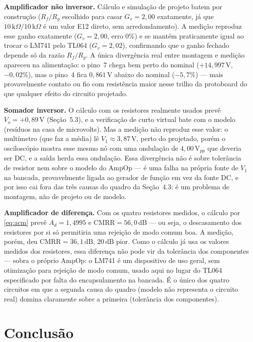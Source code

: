 \documentclass[11pt,a4paper]{article}
\begin{document}
\textbf{Amplificador não inversor.} Cálculo e simulação de projeto batem por construção
($R_f/R_g$ escolhido para casar $G_v{=}2{,}00$ exatamente, já que $10\,\text{k}\Omega/10\,
\text{k}\Omega$ é um valor E12 direto, sem arredondamento). A medição reproduz esse ganho
exatamente ($G_v{=}2{,}00$, erro $0\%$) e se mantém praticamente igual ao trocar o LM741 pelo
TL064 ($G_v{=}2{,}02$), confirmando que o ganho fechado depende só da razão $R_f/R_g$. A única
divergência real entre montagem e medição apareceu na alimentação: o pino~7 chega bem perto do
nominal ($+14{,}997\,\text{V}$, $-0{,}02\%$), mas o pino~4 fica $0{,}861\,\text{V}$ abaixo do
nominal ($-5{,}7\%$) — mais provavelmente contato ou fio com resistência maior nesse trilho da
protoboard do que qualquer efeito do circuito projetado.

\textbf{Somador inversor.} O cálculo com os resistores realmente usados prevê
$V_o{=}+0{,}89\,\text{V}$ (Seção~5.3), e a verificação de curto virtual bate com o modelo
(resíduos na casa de microvolts). Mas a medição não reproduz esse valor: o multímetro (que
faz a média) lê $V_1{\approx}3{,}87\,\text{V}$, perto do projetado, porém o osciloscópio mostra
esse mesmo nó com uma ondulação de $4{,}00\,\text{V}_{pp}$ que deveria ser DC, e a saída herda
essa ondulação. Essa divergência não é sobre tolerância de resistor nem sobre o modelo do
AmpOp — é uma falha na própria fonte de $V_1$ na bancada, provavelmente ligada ao gerador de
função em vez da fonte DC, e por isso cai fora das três causas do quadro da Seção~4.3: é um
problema de montagem, não de projeto ou de modelo.

\textbf{Amplificador de diferença.} Com os quatro resistores medidos, o cálculo por
\eqref{eq:acm} prevê $A_d{=}1{,}4995$ e $\text{CMRR}{=}56{,}0\,\text{dB}$ — ou seja, o
descasamento dos resistores por si só permitiria uma rejeição de modo comum boa. A medição,
porém, deu $\text{CMRR}{=}36{,}1\,\text{dB}$, $20\,\text{dB}$ pior. Como o cálculo já usa os
valores medidos dos resistores, essa diferença não pode vir da tolerância dos componentes —
sobra o próprio AmpOp: o LM741 é um dispositivo de uso geral, sem otimização para rejeição de
modo comum, usado aqui no lugar do TL064 especificado por falta do encapsulamento na bancada.
É o único dos quatro circuitos em que a segunda causa do quadro (modelo não representa o
circuito real) domina claramente sobre a primeira (tolerância dos componentes).

\section{Conclusão}
\end{document}
